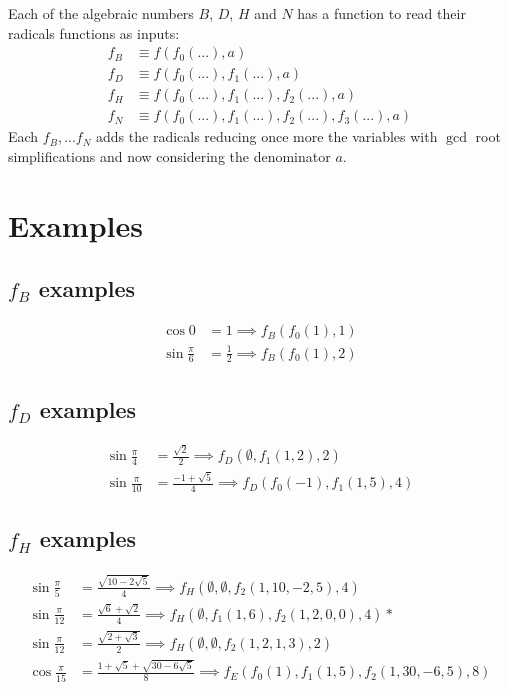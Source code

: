 \documentclass{article}
\begin{document}
Each of the algebraic numbers $B$, $D$, $H$ and $N$ has a function to read their radicals functions as inputs:
\begin{align}
f_B &\equiv f(f_0(...), a)\\
f_D &\equiv f(f_0(...), f_1(...), a)\\
f_H &\equiv f(f_0(...), f_1(...), f_2(...), a)\\
f_N &\equiv f(f_0(...), f_1(...), f_2(...), f_3(...), a)
\end{align}
Each $f_B,...f_N$ adds the radicals reducing once more the variables with $\gcd$ root simplifications
and now considering the denominator $a$.

\section{Examples}

\subsection{$f_B$ examples}
\begin{align}
\cos{0}             &= 1           \implies f_B(f_0(1),1)\\
\sin{\frac{\pi}{6}} &= \frac{1}{2} \implies f_B(f_0(1),2)
\end{align}

\subsection{$f_D$ examples}
\begin{align}
\sin{\frac{\pi}{4}}  &= \frac{\sqrt{2}}{2}    \implies f_D(\emptyset,f_1(1,2),2)\\
\sin{\frac{\pi}{10}} &= \frac{-1+\sqrt{5}}{4} \implies f_D(f_0(-1),f_1(1,5),4)
\end{align}

\subsection{$f_H$ examples}
\begin{align}
\sin{\frac{\pi}{5}}  &= \frac{\sqrt{10-2\sqrt{5}}}{4} \implies f_H(\emptyset,\emptyset,f_2(1,10,-2,5),4)\\
\sin{\frac{\pi}{12}} &= \frac{\sqrt{6} + \sqrt{2}}{4} \implies f_H(\emptyset,f_1(1,6),f_2(1,2,0,0),4) *\\
\sin{\frac{\pi}{12}} &= \frac{\sqrt{2 + \sqrt{3}}}{2} \implies f_H(\emptyset,\emptyset,f_2(1,2,1,3),2)\\
\cos{\frac{\pi}{15}} &= \frac{1+\sqrt{5}+\sqrt{30-6\sqrt{5}}}{8} \implies f_E(f_0(1),f_1(1,5),f_2(1,30,-6,5),8)
\end{align}
\end{document}
